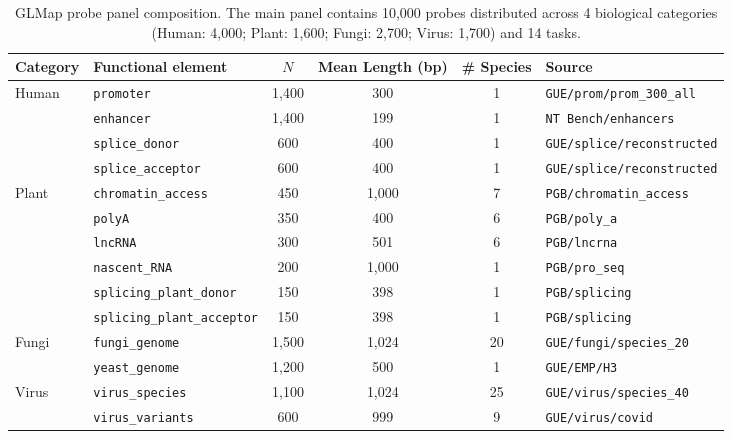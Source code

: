 \begin{table}[t]
  \centering
  \caption{GLMap probe panel composition. The main panel contains 10,000 probes distributed across 4 biological categories (Human: 4,000; Plant: 1,600; Fungi: 2,700; Virus: 1,700) and 14 tasks.}
  \label{tab:panel_composition}
  \small
  \begin{tabular}{l l c c c l}
    \toprule
    Category & Functional element & $N$ & Mean Length (bp) & \# Species & Source \\
    \midrule
Human & \texttt{promoter} & 1,400 & 300 & 1 & \texttt{GUE/prom/prom\_300\_all} \\
 & \texttt{enhancer} & 1,400 & 199 & 1 & \texttt{NT Bench/enhancers} \\
 & \texttt{splice\_donor} & 600 & 400 & 1 & \texttt{GUE/splice/reconstructed} \\
 & \texttt{splice\_acceptor} & 600 & 400 & 1 & \texttt{GUE/splice/reconstructed} \\
\midrule
Plant & \texttt{chromatin\_access} & 450 & 1,000 & 7 & \texttt{PGB/chromatin\_access} \\
 & \texttt{polyA} & 350 & 400 & 6 & \texttt{PGB/poly\_a} \\
 & \texttt{lncRNA} & 300 & 501 & 6 & \texttt{PGB/lncrna} \\
 & \texttt{nascent\_RNA} & 200 & 1,000 & 1 & \texttt{PGB/pro\_seq} \\
 & \texttt{splicing\_plant\_donor} & 150 & 398 & 1 & \texttt{PGB/splicing} \\
 & \texttt{splicing\_plant\_acceptor} & 150 & 398 & 1 & \texttt{PGB/splicing} \\
\midrule
Fungi & \texttt{fungi\_genome} & 1,500 & 1,024 & 20 & \texttt{GUE/fungi/species\_20} \\
 & \texttt{yeast\_genome} & 1,200 & 500 & 1 & \texttt{GUE/EMP/H3} \\
\midrule
Virus & \texttt{virus\_species} & 1,100 & 1,024 & 25 & \texttt{GUE/virus/species\_40} \\
 & \texttt{virus\_variants} & 600 & 999 & 9 & \texttt{GUE/virus/covid} \\
    \bottomrule
  \end{tabular}
\end{table}

